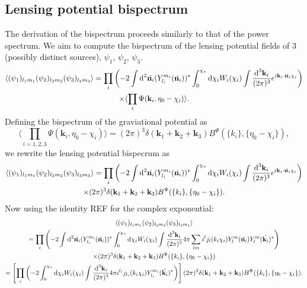 \documentclass[11pt]{article} %
\DeclareRobustCommand{\d}{\ifmmode\text{d}\else d\fi}
\newcommand{\br}[1]{\ensuremath{\left( #1 \right)}}
\newcommand{\sbr}[1]{\ensuremath{\left[ #1 \right]}}
\begin{document}
\subsection{Lensing potential bispectrum}
The derivation of the bispectrum proceeds similarly to that of the power spectrum. We aim to compute the bispectrum of the lensing potential fields of 3 (possibly distinct sources), $\psi_1$, $\psi_2$, $\psi_3$. 
\begin{gather*}
    \langle (\psi_1)_{l_1m_1}(\psi_2)_{l_2m_2}(\psi_3)_{l_3m_3} \rangle = 
    \prod_i\br{-2\int\d^2\hat{\mathbf n_i}(Y^{m_i}_{l_i}(\hat{\mathbf n_i}))^*\int_0^{\chi_*}\d\chi_i W_i(\chi_i)\int\frac{\d^3\mathbf k_i}{(2\pi)^{3}}e^{i\mathbf k_i \cdot\hat{\mathbf n_i}\chi_i}} \\
    \times \langle \prod_i\Psi(\mathbf k_i, \eta_0 - \chi_i) \rangle.
\end{gather*}
Defining the bispectrum of the graviational potential as
\begin{equation*}
    \langle \prod_{i=1,2,3}\Psi(\mathbf k_i, \eta_0 - \chi_i) \rangle = (2\pi)^3\delta(\mathbf k_1 + \mathbf k_2 + \mathbf k_3)B^\Psi(\{k_i\}, \{\eta_0-\chi_i\}),
\end{equation*}
we rewrite the lensing potential bispecrum as
\begin{gather*}
    \langle (\psi_1)_{l_1m_1}(\psi_2)_{l_2m_2}(\psi_3)_{l_3m_3} \rangle = 
    \prod_i\br{-2\int\d^2\hat{\mathbf n_i}(Y^{m_i}_{l_i}(\hat{\mathbf n_i}))^*\int_0^{\chi_*}\d\chi_i W_i(\chi_i)\int\frac{\d^3\mathbf k_i}{(2\pi)^{3}}e^{i\mathbf k_i \cdot\hat{\mathbf n_i}\chi_i}}\\ \times (2\pi)^3\delta(\mathbf k_1 + \mathbf k_2 + \mathbf k_3)B^\Psi(\{k_i\}, \{\eta_0-\chi_i\}).
\end{gather*}
Now using the identity REF for the complex exponential:
\begin{gather*}
    \langle (\psi_1)_{l_1m_1}(\psi_2)_{l_2m_2}(\psi_3)_{l_3m_3} \rangle \\ = 
    \prod_i\br{-2\int\d^2\hat{\mathbf n_i}(Y^{m_i}_{l_i}(\hat{\mathbf n_i}))^*\int_0^{\chi_*}\d\chi_i W_i(\chi_i)\int\frac{\d^3\mathbf k_i}{(2\pi)^{3}}4\pi\sum_{lm}i^{l}j_{l}(k_i\chi_i)Y_{l}^{m}(\hat{\mathbf n_i})Y_{l}^{m}(\hat{\mathbf k_i})^*}\\
    \times (2\pi)^3\delta(\mathbf k_1 + \mathbf k_2 + \mathbf k_3)B^\Psi(\{k_i\}, \{\eta_0-\chi_i\}) \\
    = \sbr{\prod_i\br{-2\int_0^{\chi_*}\d\chi_i W_i(\chi_i)\int\frac{\d^3\mathbf k_i}{(2\pi)^{3}}4\pi i^{l_i}j_{l_i}(k_i\chi_i)Y_{l_i}^{m_i}(\hat{\mathbf k_i})^*}} (2\pi)^3\delta(\mathbf k_1 + \mathbf k_2 + \mathbf k_3)B^\Psi(\{k_i\}, \{\eta_0-\chi_i\}).
\end{gather*}
\end{document}
